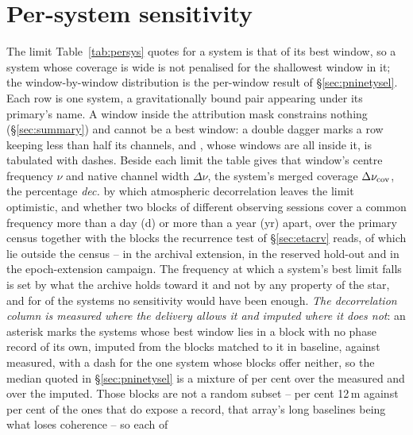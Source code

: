 \section{Per-system sensitivity}
\label{app:persys}

The limit Table~\ref{tab:persys} quotes for a system is that of its best
window, so a system whose coverage is wide is not penalised for the
shallowest window in it; the window-by-window distribution is the per-window
result of \S\ref{sec:pninetysel}. Each row is one system, a gravitationally
bound pair appearing under its primary's name. A window inside the attribution mask
constrains nothing (\S\ref{sec:summary}) and cannot be a best window: a
double dagger marks a row keeping less than half its channels, and
\NSysALostName{}, whose \UmNWinALostWin{} windows are all inside it, is
tabulated with dashes. Beside each limit the table
gives that window's centre frequency $\nu$ and native channel width
$\Delta\nu$, the system's merged coverage $\Delta\nu_{\rm cov}$, the
percentage \emph{dec.} by which atmospheric decorrelation leaves the limit
optimistic, and whether two blocks of different observing sessions cover a
common frequency more than a day (d) or more than a year (yr) apart, over the
primary census together with the \ZcNRecEB{} blocks the recurrence
test of \S\ref{sec:etacrv} reads, of which \ZcNRecEBOut{} lie outside the
census -- \ZcNRecEBOutExt{} in the archival extension, \ZcNRecEBOutHold{} in
the reserved hold-out and \ZcNRecEBOutEpoch{} in the epoch-extension
campaign. The frequency at which a system's best limit falls is set by what the
archive holds toward it and not by any property of the star, and for
\ZcNoRepSys{} of the \NSysClassA{} systems no sensitivity would have been
enough. \emph{The decorrelation column is measured where the delivery allows
it and imputed where it does not}: an asterisk marks the
\NgNDecImpSys{} systems whose best window lies in a block with no phase record
of its own, imputed from the blocks matched to it in baseline, against
\NgNDecMeasSys{} measured, with a dash for the one system whose
blocks offer neither, so the median quoted in \S\ref{sec:pninetysel} is a
mixture of
\NgDecMeasMedPct{} per cent over the measured and \NgDecImpMedPct{} over the
imputed. Those blocks are not a random subset -- \NbDecPctTwelveUn{} per cent
12\,m against \NbDecPctTwelveMeas{} per cent of the ones that do expose a
record, that array's long baselines being what loses coherence -- so each of
